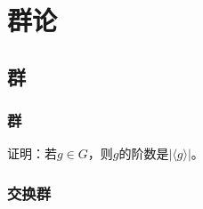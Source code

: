 \documentclass[../main.tex]{subfiles}
\begin{document}
\setcounter{chapter}{3}
\chapter{群论}
\section{群}
\subsection{群}
\begin{exercise}\label{exe:order_and_cyclic_subgroup}
证明：若$g\in G$，则$g$的阶数是$|\langle g\rangle|$。
\end{exercise}
\subsection{交换群}
\end{document}
